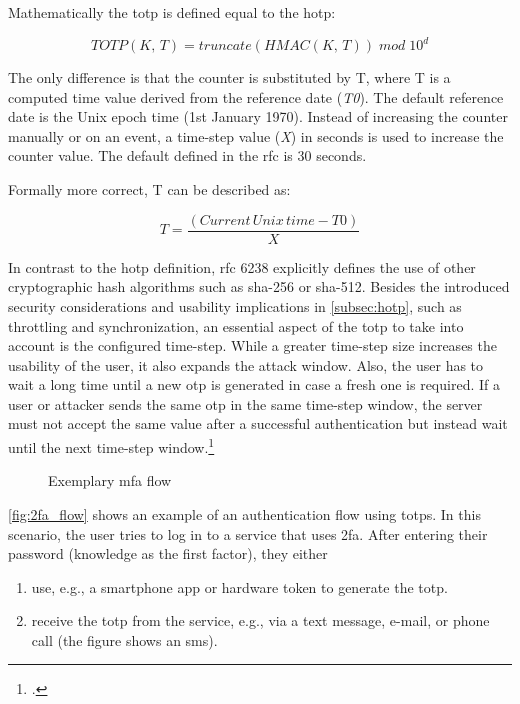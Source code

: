 Mathematically the \gls{totp} is defined equal to the \gls{hotp}:

\begin{equation*}
	TOTP(K,\, T) = truncate(HMAC(K,\, T))\; mod \; 10^d
\end{equation*}

The only difference is that the counter is substituted by T, where T is a computed time value derived from the reference date (\textit{T0}). The default reference date is the Unix epoch time (1st January 1970). Instead of increasing the counter manually or on an event, a time-step value (\textit{X}) in seconds is used to increase the counter value. The default defined in the \gls{rfc} is 30 seconds.

Formally more correct, T can be described as:

\begin{equation*}
	T = \frac{(Current\, Unix\, time - T0)}{X}
\end{equation*}

In contrast to the \gls{hotp} definition, \gls{rfc} 6238 explicitly defines the use of other cryptographic hash algorithms such as \gls{sha}-256 or \gls{sha}-512. Besides the introduced security considerations and usability implications  in \autoref{subsec:hotp}, such as throttling and synchronization, an essential aspect of the \gls{totp} to take into account is the configured time-step. While a greater time-step size increases the usability of the user, it also expands the attack window. Also, the user has to wait a long time until a new \gls{otp} is generated in case a fresh one is required. If a user or attacker sends the same \gls{otp} in the same time-step window, the server must not accept the same value after a successful authentication but instead wait until the next time-step window.\footcite[See][6]{m2011rfc}

\begin{figure}[hbt]
	\centering
	
	\caption[Exemplary \gls{mfa} flow]{Exemplary \gls{mfa} flow\footnotemark}
	\label{fig:2fa_flow}
\end{figure}

\autoref{fig:2fa_flow} shows an example of an authentication flow using \glspl{totp}. In this scenario, the user tries to log in to a service that uses \gls{2fa}. After entering their password (knowledge as the first factor), they either

\begin{enumerate}[label=(\alph*)]
	\item use, e.g., a smartphone app or hardware token to generate the \gls{totp}.
	\item receive the \gls{totp} from the service, e.g., via a text message, e-mail, or phone call (the figure shows an \gls{sms}).
\end{enumerate}

